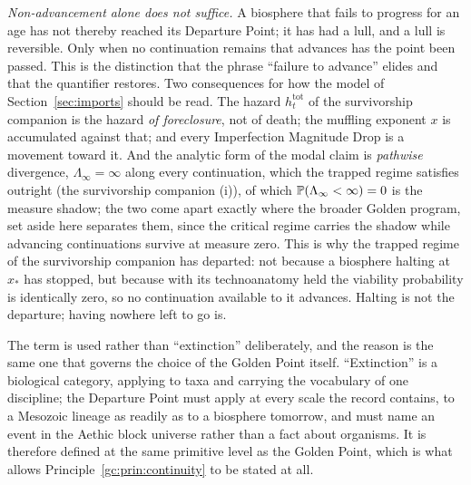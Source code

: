 \begin{definition}
\emph{Non-advancement alone does not suffice.} A biosphere that fails
to progress for an age has not thereby reached its Departure Point; it
has had a lull, and a lull is reversible. Only when no continuation
remains that advances has the point been passed. This is the
distinction that the phrase ``failure to advance'' elides and that the
quantifier restores. Two consequences for how the model of Section~\ref{sec:imports} should be read.
The hazard $h^{\mathrm{tot}}_t$ of the survivorship companion \cite{GoldenSurvivorship} is the hazard
\emph{of foreclosure}, not of death; the muffling exponent $x$ is
accumulated against that; and every Imperfection Magnitude Drop is a
movement toward it. And the analytic form of the modal claim is \emph{pathwise}
divergence, $\Lambda_\infty=\infty$ along every continuation, which
the trapped regime satisfies outright
(the survivorship companion \cite{GoldenSurvivorship}(i)), of which
$\mathbb{P}(\Lambda_\infty<\infty)=0$ is the measure shadow; the two come
apart exactly where the broader Golden program, set aside here separates
them, since the critical regime carries the shadow while advancing
continuations survive at measure zero. This is why the
trapped regime of the survivorship companion \cite{GoldenSurvivorship} has
departed: not because a biosphere halting at $x_\ast$ has stopped, but
because with its technoanatomy held the viability probability is identically zero, so
no continuation available to it advances. Halting is not the departure;
having nowhere left to go is.

The term is used rather than ``extinction'' deliberately, and the
reason is the same one that governs the choice of the Golden Point
itself. ``Extinction'' is a biological category, applying to taxa and
carrying the vocabulary of one discipline; the Departure Point must
apply at every scale the record contains, to a Mesozoic lineage as
readily as to a biosphere tomorrow, and must name an event in the
Aethic block universe rather than a fact about organisms. It is
therefore defined at the same primitive level as the Golden Point,
which is what allows Principle~\ref{gc:prin:continuity} to be stated at
all.


\end{definition}
